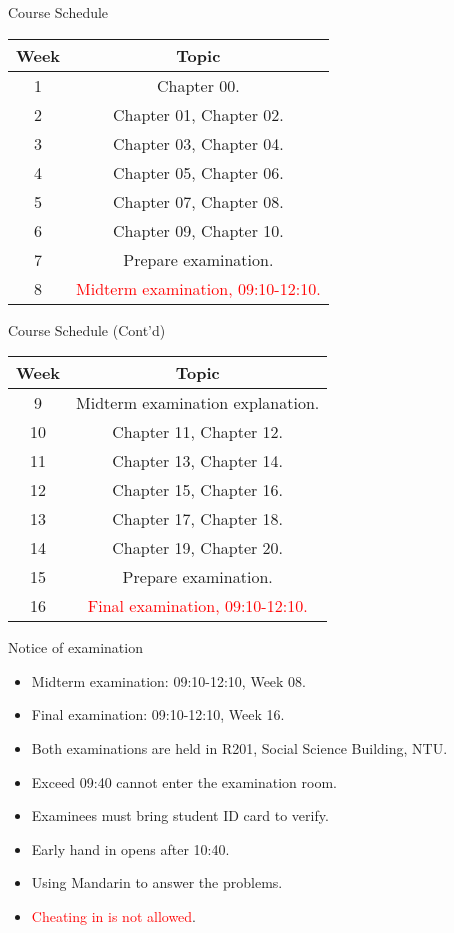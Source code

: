 \documentclass{beamer}
\begin{document}
\begin{frame}{Course Schedule}
\begin{center}
\begin{tabular}{|c|c|}
\hline
Week & Topic \\
\hline
1 & Chapter 00.\\
\hline
2 & Chapter 01, Chapter 02.\\
\hline
3 & Chapter 03, Chapter 04.\\
\hline
4 & Chapter 05, Chapter 06.\\
\hline
5 & Chapter 07, Chapter 08.\\
\hline
6 & Chapter 09, Chapter 10.\\
\hline
7 & Prepare examination.\\
\hline
8 & \textcolor{red}{Midterm examination, 09:10-12:10.}\\
\hline
\end{tabular}
\end{center}
\end{frame}
\begin{frame}{Course Schedule (Cont'd)}
\begin{center}
\begin{tabular}{|c|c|}
\hline
Week & Topic \\
\hline
9 & Midterm examination explanation.\\
\hline
10 & Chapter 11, Chapter 12.\\
\hline
11 & Chapter 13, Chapter 14.\\
\hline
12 & Chapter 15, Chapter 16.\\
\hline
13 & Chapter 17, Chapter 18.\\
\hline
14 & Chapter 19, Chapter 20.\\
\hline
15 & Prepare examination.\\
\hline
16 & \textcolor{red}{Final examination, 09:10-12:10.}\\
\hline
\end{tabular}
\end{center}
\end{frame}
\begin{frame}{Notice of examination}
    \begin{itemize}
    \pause
    \item Midterm examination: 09:10-12:10, Week 08.
    \pause
    \item Final examination: 09:10-12:10, Week 16.
    \pause
    \item Both examinations are held in R201, Social Science Building, NTU.
    \pause
    \item Exceed 09:40 cannot enter the examination room.
    \pause
    \item Examinees must bring student ID card to verify.
    \pause
    \item Early hand in opens after 10:40.
    \pause
    \item Using Mandarin to answer the problems.
    \pause
    \item \textcolor{red}{Cheating in is not allowed}.
    \end{itemize}
\end{frame}
\end{document}
